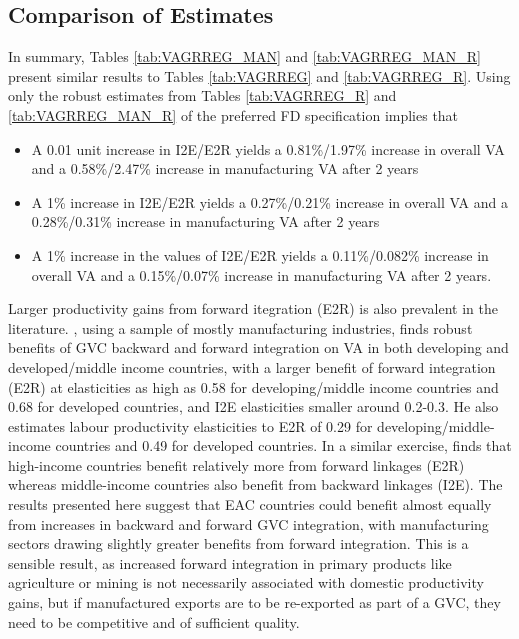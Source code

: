 \documentclass[a4paper]{article}
\begin{document}
\subsection{Comparison of Estimates}
In summary, Tables \ref{tab:VAGRREG_MAN} and \ref{tab:VAGRREG_MAN_R} present similar results to Tables \ref{tab:VAGRREG} and \ref{tab:VAGRREG_R}. Using only the robust estimates from Tables \ref{tab:VAGRREG_R} and \ref{tab:VAGRREG_MAN_R} of the preferred FD specification implies that
\begin{itemize}
\item A 0.01 unit increase in I2E/E2R yields a 0.81\%/1.97\% increase in overall VA and a 0.58\%/2.47\% increase in manufacturing VA after 2 years
\item A 1\% increase in I2E/E2R yields a 0.27\%/0.21\% increase in overall VA and a 0.28\%/0.31\% increase in manufacturing VA after 2 years
\item A 1\% increase in the values of I2E/E2R yields a 0.11\%/0.082\% increase in overall VA and a 0.15\%/0.07\% increase in manufacturing VA after 2 years.
\end{itemize}

Larger productivity gains from forward itegration (E2R) is also prevalent in the literature. \citet{Kummritz20161}, using a sample of mostly manufacturing industries, finds robust benefits of GVC backward and forward integration on VA in both developing and developed/middle income countries, with a larger benefit of forward integration (E2R) at elasticities as high as 0.58 for developing/middle income countries and 0.68 for developed countries, and I2E elasticities smaller around 0.2-0.3. He also estimates labour productivity elasticities to E2R of 0.29 for developing/middle-income countries and 0.49 for developed countries. In a similar exercise, \citet{kummritz2015global} finds that high-income countries benefit relatively more from forward linkages (E2R) whereas middle-income countries also benefit from backward linkages (I2E). The results presented here suggest that EAC countries could benefit almost equally from increases in backward and forward GVC integration, with manufacturing sectors drawing slightly greater benefits from forward integration. 
This is a sensible result, as increased forward integration in primary products like agriculture or mining is not necessarily associated with domestic productivity gains, but if manufactured exports are to be re-exported as part of a GVC, they need to be competitive and of sufficient quality. \newline
\end{document}
